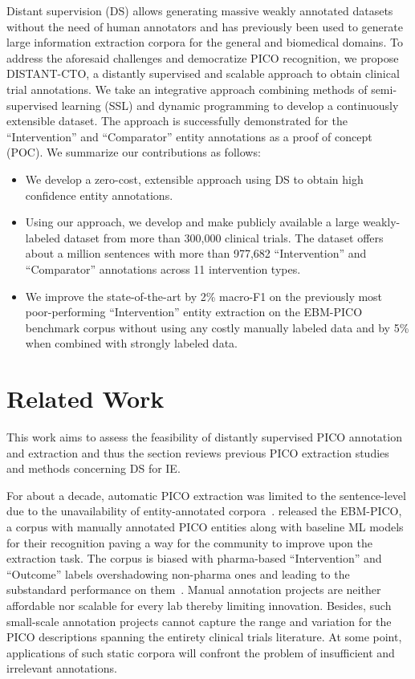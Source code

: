 \documentclass[letterpaper]{article} %
\begin{document}
Distant supervision (DS) allows generating massive weakly annotated datasets without the need of human annotators and has previously been used to generate large information extraction corpora for the general and biomedical domains.
To address the aforesaid challenges and democratize PICO recognition, we propose DISTANT-CTO, a distantly supervised and scalable approach to obtain clinical trial annotations.
We take an integrative approach combining methods of semi-supervised learning (SSL) and dynamic programming to develop a continuously extensible dataset.
The approach is successfully demonstrated for the ``Intervention'' and ``Comparator'' entity annotations as a proof of concept (POC).
We summarize our contributions as follows:

\begin{itemize}
    \item We develop a zero-cost, extensible approach using DS to obtain high confidence entity annotations.
    \item Using our approach, we develop and make publicly available a large weakly-labeled dataset from more than 300,000 clinical trials. The dataset offers about a million sentences with more than 977,682 ``Intervention'' and ``Comparator'' annotations across 11 intervention types.
    \item We improve the state-of-the-art by 2\% macro-F1 on the previously most poor-performing ``Intervention'' entity extraction on the EBM-PICO benchmark corpus without using any costly manually labeled data and by 5\% when combined with strongly labeled data.
\end{itemize}
%
%
%
\section{Related Work}
\label{sec:relworks}
%
This work aims to assess the feasibility of distantly supervised PICO annotation and extraction and thus the section reviews previous PICO extraction studies and methods concerning DS for IE.

For about a decade, automatic PICO extraction was limited to the sentence-level due to the unavailability of entity-annotated corpora~\citep{boudin2010combining, huang2011classification, huang2013pico, wallace2016extracting, jin2018pico}.
\citeauthor{nye2018corpus} released the EBM-PICO, a corpus with manually annotated PICO entities along with baseline ML models for their recognition paving a way for the community to improve upon the extraction task.
The corpus is biased with pharma-based ``Intervention'' and ``Outcome'' labels overshadowing non-pharma ones and leading to the substandard performance on them~\citep{nye2018corpus,beltagy2019scibert,brockmeier2019improving,zhang2020unlocking}.
Manual annotation projects are neither affordable nor scalable for every lab thereby limiting innovation.
Besides, such small-scale annotation projects cannot capture the range and variation for the PICO descriptions spanning the entirety clinical trials literature.
At some point, applications of such static corpora will confront the problem of insufficient and irrelevant annotations.
\end{document}
